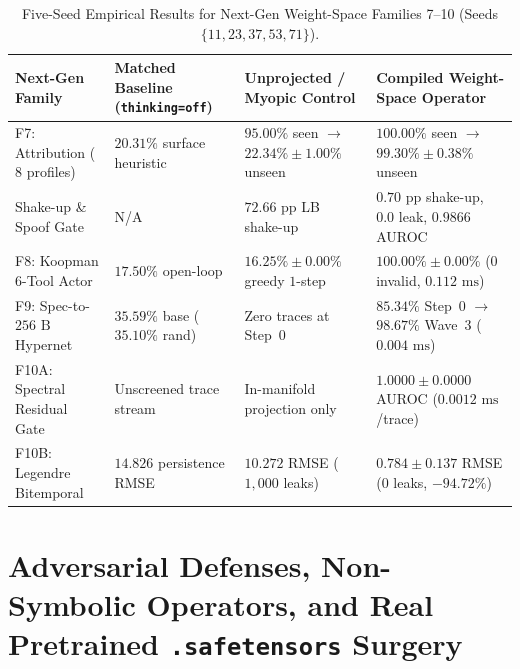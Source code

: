 \documentclass[11pt,a4paper]{article}
\begin{document}
\begin{table}[htbp]
\centering
\caption{Five-Seed Empirical Results for Next-Gen Weight-Space Families 7--10 (Seeds $\{11, 23, 37, 53, 71\}$).}
\label{tab:nextgen_families}
\small
\begin{tabular}{@{}llll@{}}
\toprule
\textbf{Next-Gen Family} & \textbf{Matched Baseline (\texttt{thinking=off})} & \textbf{Unprojected / Myopic Control} & \textbf{Compiled Weight-Space Operator} \\
\midrule
F7: Attribution ($8$ profiles) & $20.31\%$ surface heuristic & $95.00\%$ seen $\to$ $22.34\% \pm 1.00\%$ unseen & $100.00\%$ seen $\to$ $99.30\% \pm 0.38\%$ unseen \\
\quad Shake-up \& Spoof Gate & N/A & $72.66\text{ pp}$ LB shake-up & $0.70\text{ pp}$ shake-up, $0.0$ leak, $0.9866$ AUROC \\
F8: Koopman $6$-Tool Actor & $17.50\%$ open-loop & $16.25\% \pm 0.00\%$ greedy $1$-step & $100.00\% \pm 0.00\%$ ($0$ invalid, $0.112\text{ ms}$) \\
F9: Spec-to-$256\text{ B}$ Hypernet & $35.59\%$ base ($35.10\%$ rand) & Zero traces at Step~$0$ & $85.34\%$ Step~$0$ $\to$ $98.67\%$ Wave~$3$ ($0.004\text{ ms}$) \\
F10A: Spectral Residual Gate & Unscreened trace stream & In-manifold projection only & $1.0000 \pm 0.0000$ AUROC ($0.0012\text{ ms}$/trace) \\
F10B: Legendre Bitemporal & $14.826$ persistence RMSE & $10.272$ RMSE ($1{,}000$ leaks) & $0.784 \pm 0.137$ RMSE ($0$ leaks, $-94.72\%$) \\
\bottomrule
\end{tabular}
\end{table}

\section{Adversarial Defenses, Non-Symbolic Operators, and Real Pretrained \texttt{.safetensors} Surgery}
\end{document}
